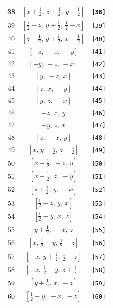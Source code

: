 \documentclass[fleqn,8pt]{jsarticle}
\begin{document}
\begin{longtable}{ccc}
38 & $\left[ x + \frac{1}{2},\, z + \frac{1}{2},\, y + \frac{1}{2} \right]$ & {\tt [38]} \\ \hline
39 & $\left[ \frac{1}{2} - z,\, y + \frac{1}{2},\, \frac{1}{2} - x \right]$ & {\tt [39]} \\ \hline
40 & $\left[ z + \frac{1}{2},\, y + \frac{1}{2},\, x + \frac{1}{2} \right]$ & {\tt [40]} \\ \hline
41 & $\left[ - z,\, - x,\, - y \right]$ & {\tt [41]} \\ \hline
42 & $\left[ - y,\, - z,\, - x \right]$ & {\tt [42]} \\ \hline
43 & $\left[ y,\, - z,\, x \right]$ & {\tt [43]} \\ \hline
44 & $\left[ z,\, x,\, - y \right]$ & {\tt [44]} \\ \hline
45 & $\left[ y,\, z,\, - x \right]$ & {\tt [45]} \\ \hline
46 & $\left[ - z,\, x,\, y \right]$ & {\tt [46]} \\ \hline
47 & $\left[ - y,\, z,\, x \right]$ & {\tt [47]} \\ \hline
48 & $\left[ z,\, - x,\, y \right]$ & {\tt [48]} \\ \hline
49 & $\left[ x,\, y + \frac{1}{2},\, z + \frac{1}{2} \right]$ & {\tt [49]} \\ \hline
50 & $\left[ x + \frac{1}{2},\, - z,\, y \right]$ & {\tt [50]} \\ \hline
51 & $\left[ x + \frac{1}{2},\, z,\, - y \right]$ & {\tt [51]} \\ \hline
52 & $\left[ z + \frac{1}{2},\, y,\, - x \right]$ & {\tt [52]} \\ \hline
53 & $\left[ \frac{1}{2} - z,\, y,\, x \right]$ & {\tt [53]} \\ \hline
54 & $\left[ \frac{1}{2} - y,\, x,\, z \right]$ & {\tt [54]} \\ \hline
55 & $\left[ y + \frac{1}{2},\, - x,\, z \right]$ & {\tt [55]} \\ \hline
56 & $\left[ x,\, \frac{1}{2} - y,\, \frac{1}{2} - z \right]$ & {\tt [56]} \\ \hline
57 & $\left[ - x,\, y + \frac{1}{2},\, \frac{1}{2} - z \right]$ & {\tt [57]} \\ \hline
58 & $\left[ - x,\, \frac{1}{2} - y,\, z + \frac{1}{2} \right]$ & {\tt [58]} \\ \hline
59 & $\left[ y + \frac{1}{2},\, x,\, - z \right]$ & {\tt [59]} \\ \hline
60 & $\left[ \frac{1}{2} - y,\, - x,\, - z \right]$ & {\tt [60]} \\ \hline

\end{longtable}
\end{document}
